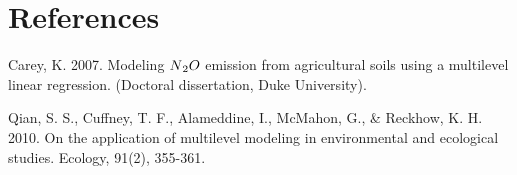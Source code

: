 \documentclass[12pt, oneside]{article}
\newif\ifanswers
\begin{document}
\ifanswers
\newpage
\begin{center}
\texttt{[image: DAG5.png]}
\end{center}
\begin{align*}
g\big(\alpha_{j},\beta_{j},\log(x_{ij})\big) &=\alpha_{j}+\beta_{j}\log\big(x_{ij}\big)\\
\big[\bm{\alpha},\bm{\beta},\mu_{\alpha},\mu_{\beta},\sigma,\varsigma_{\alpha},\varsigma_{\beta},\rho\mid\mathbf{y}\big] & \propto\prod_{j=1}^{J}\prod_{i=1}^{n_{j}}\text{normal}\big(\log(y_{ij})\mid g\big(\alpha_{j},\beta_{j},\log(x_{ij})\big),\sigma^{2}\big)\nonumber \\
  &\times\text{multivariate normal}\left(\left(\begin{array}{c} \alpha_{j}\\
\beta_{j}
\end{array}\right)\biggm|\left(\begin{array}{c}
\mu_{\alpha}\\
\mu_{\beta}
\end{array}\right),\left(\begin{array}{cc}
\varsigma_{\alpha}^{2} & \rho\varsigma_{\alpha}\varsigma_{\beta}\\
\rho\varsigma_{\alpha}\varsigma_{\beta} & \varsigma_{\beta}^{2}
\end{array}\right)\right)\nonumber \\
 & \times \text{normal}\big(\mu_{\alpha}\mid 0,1000\big)\\
 & \times \text{normal}\big(\mu_{\beta}\mid 0,1000\big)\\
 & \times \text{uniform}\big(\sigma\mid 0,100\big)\\
 & \times \text{uniform}\big(\varsigma_{\alpha}\mid 0,200\big)\\
 & \times \text{uniform}\big(\varsigma_{\beta}\mid 0,200\big) \\
 & \times \text{uniform}\big(\rho \mid 0,1\big)\\
\end{align*}
\fi
 
\section*{References}
\begin{hangparas}{.25in}{1} 
Carey, K. 2007. Modeling $N\textsubscript{2}O$ emission from agricultural soils using a multilevel linear regression. (Doctoral dissertation, Duke University).

\vspace{.5cm}
Qian, S. S., Cuffney, T.  F., Alameddine, I., McMahon, G., \& Reckhow, K. H. 2010. On the application of multilevel modeling in environmental and ecological studies. Ecology, 91(2), 355-361. 
\end{hangparas} 
\end{document}
